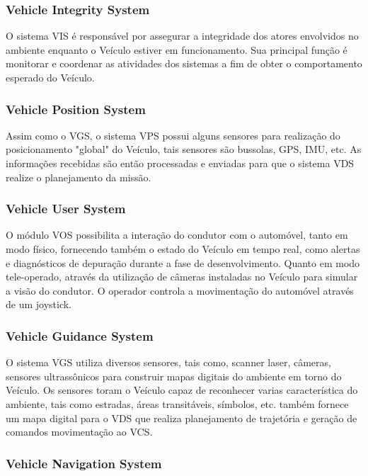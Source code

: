 \documentclass[conference]{IEEEtran}
\begin{document}
\subsubsection{Vehicle Integrity System}\label{subsec:vis}


O sistema VIS é responsável por assegurar a integridade dos atores envolvidos no ambiente enquanto o Veículo estiver em funcionamento. Sua principal função é monitorar e coordenar as atividades dos sistemas a fim de obter o comportamento esperado do Veículo.


\subsubsection{Vehicle Position System}\label{subsec:vps}


Assim como o VGS, o sistema VPS possui alguns sensores para realização do posicionamento "global" do Veículo, tais sensores são bussolas, GPS, IMU, etc. As informações recebidas são então processadas e enviadas para que o sistema VDS realize o planejamento da missão.


\subsubsection{Vehicle User System}\label{subsec:vus}

O módulo VOS possibilita a interação do condutor com o automóvel, tanto em modo físico, fornecendo
também o estado do Veículo em tempo real, como alertas e diagnósticos de depuração durante a fase de desenvolvimento. Quanto em modo tele-operado, através da utilização de câmeras instaladas no Veículo para simular a visão do condutor. O operador controla a movimentação do automóvel através de um joystick. 


\subsubsection{Vehicle Guidance System}\label{subsec:vgs}

O sistema VGS utiliza diversos sensores, tais como, scanner laser, câmeras, sensores ultrassônicos para construir mapas digitais do ambiente em torno do Veículo. Os sensores toram o Veículo capaz de reconhecer varias característica do ambiente, tais como estradas, áreas transitáveis, símbolos, etc. também fornece um mapa digital para o VDS que realiza planejamento de trajetória e geração de comandos movimentação ao VCS.

\subsubsection{Vehicle Navigation System}\label{subsec:vns}
\end{document}
